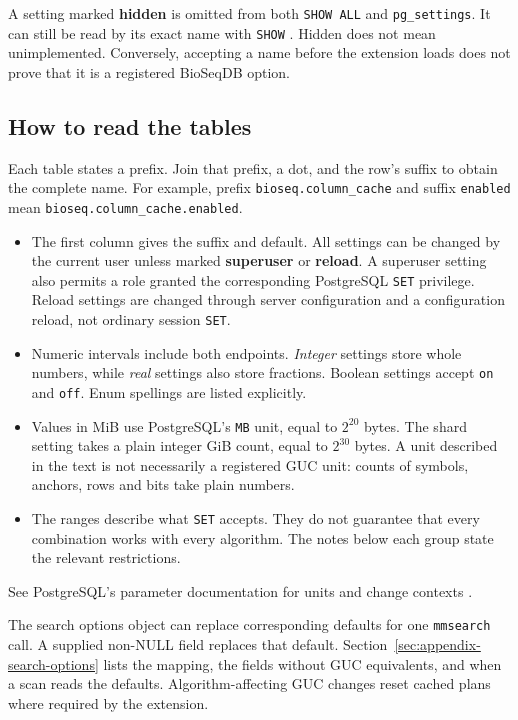 A setting marked \textbf{hidden} is omitted from both \texttt{SHOW ALL} and
\texttt{pg\_settings}. It can still be read by its exact name with \texttt{SHOW}
\autocite{postgresql17_guc_functions}.
Hidden does not mean unimplemented. Conversely, accepting a name before the
extension loads does not prove that it is a registered BioSeqDB option.

\subsection{How to read the tables}

Each table states a prefix. Join that prefix, a dot, and the row's suffix to
obtain the complete name. For example, prefix \texttt{bioseq.column\_cache}
and suffix \texttt{enabled} mean \texttt{bioseq.column\_cache.enabled}.
\begin{itemize}
  \item The first column gives the suffix and default. All settings can be
    changed by the current user unless marked \textbf{superuser} or
    \textbf{reload}. A superuser setting also permits a role granted the
    corresponding PostgreSQL \texttt{SET} privilege. Reload settings are
    changed through server configuration and a configuration reload, not
    ordinary session \texttt{SET}.
  \item Numeric intervals include both endpoints. \emph{Integer} settings store whole
    numbers, while \emph{real} settings also store fractions. Boolean settings accept
    \texttt{on} and \texttt{off}. Enum spellings are listed explicitly.
  \item Values in MiB use PostgreSQL's \texttt{MB} unit, equal to $2^{20}$ bytes.
    The shard setting takes a plain integer GiB count, equal to $2^{30}$ bytes.
    A unit described in the text is not necessarily a registered GUC unit:
    counts of symbols, anchors, rows and bits take plain numbers.
  \item The ranges describe what \texttt{SET} accepts. They do not guarantee
    that every combination works with every algorithm. The notes below each
    group state the relevant restrictions.
\end{itemize}
See PostgreSQL's parameter documentation for units and change contexts
\autocite{postgresql17_setting_parameters,postgresql17_pg_settings}.

The search options object can replace corresponding defaults for one
\texttt{mmsearch} call. A supplied non-NULL field replaces that default.
Section~\ref{sec:appendix-search-options} lists the mapping, the fields without
GUC equivalents, and when a scan reads the defaults. Algorithm-affecting GUC
changes reset cached plans where required by the extension.

